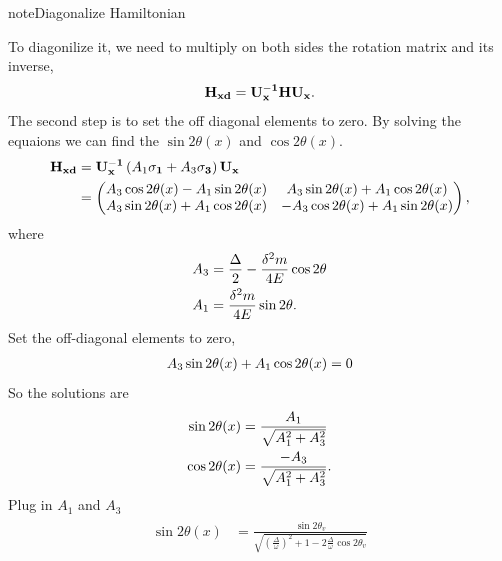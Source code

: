 \documentclass[letterpaper,12pt,english]{sphinxmanual}
\begin{document}
\begin{notice}{note}{Diagonalize Hamiltonian}

To diagonilize it, we need to multiply on both sides the rotation matrix and its inverse,
\begin{gather}
\begin{split}\mathbf {H_{xd}} = \mathbf{U_x^{-1}} \mathbf H \mathbf {U_x}.\end{split}\notag
\end{gather}
The second step is to set the off diagonal elements to zero. By solving the equaions we can find the \(\sin 2\theta(x)\) and \(\cos 2\theta(x)\).
\begin{gather}
\begin{split}\mathbf{H_{xd}} &= \mathbf{U^{-1}_x} \left( A_1 \mathbf{\sigma_1} + A_3 \mathbf{\sigma_3} \right) \mathbf{ U_x } \\
& = \begin{pmatrix} A_3\cos 2\theta(x) - A_1 \sin 2\theta(x) & A_3 \sin 2\theta(x) + A_1 \cos 2\theta(x) \\ A_3 \sin 2\theta(x) + A_1\cos 2\theta(x) &  - A_3 \cos 2\theta(x) + A_1 \sin 2\theta(x) \end{pmatrix},\end{split}\notag
\end{gather}
where
\begin{gather}
\begin{split}A_3 &  = \frac{\Delta}{2} - \frac{\delta^2 m}{4E}\cos 2\theta \\
A_1 & =  \frac{\delta^2 m}{4E} \sin 2\theta.\end{split}\notag
\end{gather}
Set the off-diagonal elements to zero,
\begin{gather}
\begin{split}A_3 \sin 2\theta(x) + A_1 \cos 2\theta(x)  = 0\end{split}\notag
\end{gather}
So the solutions are
\begin{gather}
\begin{split}\sin 2\theta(x) & = \frac{A_1}{\sqrt{A_1^2 + A_3^2}} \\
\cos 2\theta(x) & = \frac{-A_3}{\sqrt{A_1^2+A_3^2}}.\end{split}\notag
\end{gather}
Plug in \(A_1\) and \(A_3\)
\begin{gather}
\begin{split}\sin 2\theta(x)  &= \frac{\sin 2\theta_v}{\sqrt{ \left(\frac{\Delta}{\omega} \right)^2+1 - 2 \frac{\Delta}{\omega}\cos 2\theta_v }} \\

\end{split}
\end{gather}
\end{notice}
\end{document}
